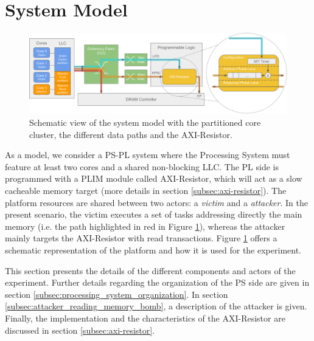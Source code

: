 \section{System Model}
    \label{sec:system_model}
    \begin{figure}
        \centering
        \includegraphics[scale=0.56]{images/Evaluation_setup.pdf}
        \caption{Schematic view of the system model with the partitioned core cluster, the different data paths and the AXI-Resistor.}
        \label{fig:system_schematic}
    \end{figure}

    As a model, we consider a PS-PL system where the Processing System must feature at least two cores and a shared non-blocking LLC.
    The PL side is programmed with a PLIM module called AXI-Resistor, which will act as a slow cacheable memory target (more details in section \ref{subsec:axi-resistor}).
    The platform resources are shared between two actors: a \emph{victim} and a \emph{attacker}.
    In the present scenario, the victim executes a set of tasks addressing directly the main memory (i.e. the path highlighted in red in Figure \ref{fig:system_schematic}), whereas the attacker mainly targets the AXI-Resistor with read transactions.
    Figure \ref{fig:system_schematic} offers a schematic representation of the platform and how it is used for the experiment.

    This section presents the details of the different components and actors of the experiment.
    Further details regarding the organization of the PS side are given in section \ref{subsec:processing_system_organization}.
    In section \ref{subsec:attacker_reading_memory_bomb}, a description of the attacker is given.
    Finally, the implementation and the characteristics of the AXI-Resistor are discussed in section \ref{subsec:axi-resistor}.

